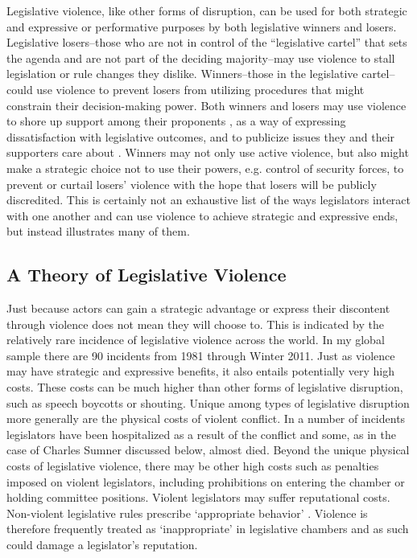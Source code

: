\documentclass[a4paper]{article}\usepackage[]{graphicx}\usepackage[]{color}
\begin{document}
Legislative violence, like other forms of disruption, can be used for both strategic \citep[see][]{Beaulieu2008,BeaulieuForthcoming} and expressive or performative \citep[see][]{Rai2013,Spary2013} purposes by both legislative winners and losers. Legislative losers--those who are not in control of the ``legislative cartel''  that sets the agenda \citep{cox2007} and are not part of the deciding majority--may use violence to stall legislation or rule changes they dislike. Winners--those in the legislative cartel--could use violence to prevent losers from utilizing procedures that might constrain their decision-making power. Both winners and losers may use violence to shore up support among their proponents \citep{wilkinson2006}, as a way of expressing dissatisfaction with legislative outcomes, and to publicize issues they and their supporters care about \citep{Spary2013}. Winners may not only use active violence, but also might make a strategic choice not to use their powers, e.g. control of security forces, to prevent or curtail losers' violence \citep[see the work on ethnic violence in India by][]{wilkinson2006} with the hope that losers will be publicly discredited. This is certainly not an exhaustive list of the ways legislators interact with one another and can use violence to achieve strategic and expressive ends, but instead illustrates many of them.

\subsection{A Theory of Legislative Violence}

Just because actors can gain a strategic advantage or express their discontent through violence does not mean they will choose to. This is indicated by the relatively rare incidence of legislative violence across the world. In my global sample there are 90 incidents from 1981 through Winter 2011. Just as violence may have strategic and expressive benefits, it also entails potentially very high costs. These costs can be much higher than other forms of legislative disruption, such as speech boycotts or shouting. Unique among types of legislative disruption more generally are the physical costs of violent conflict. In a number of incidents legislators have been hospitalized as a result of the conflict and some, as in the case of Charles Sumner discussed below, almost died. Beyond the unique physical costs of legislative violence, there may be other high costs such as penalties imposed on violent legislators, including prohibitions on entering the chamber or holding committee positions. Violent legislators may suffer reputational costs. Non-violent legislative rules prescribe `appropriate behavior' \citep{March2008}. Violence is therefore frequently treated as `inappropriate' in legislative chambers and as such could damage a legislator's reputation. 
\end{document}
